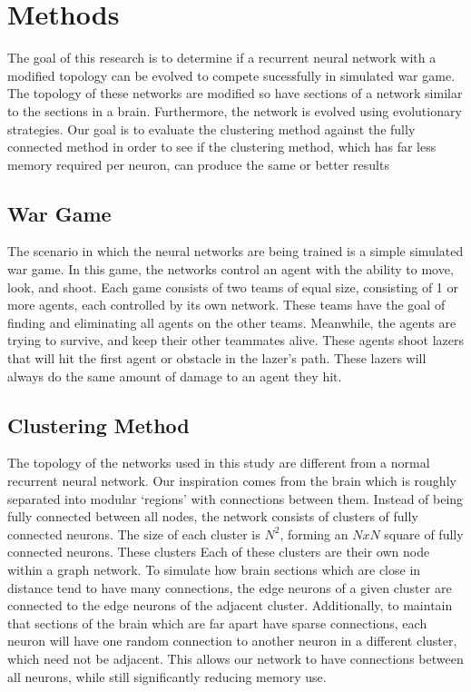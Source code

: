 \documentclass[journal]{IEEEtran}
\begin{document}
\section{Methods}
    The goal of this research is to determine if a recurrent neural network with a modified topology can be evolved to 
    compete sucessfully in simulated war game. The topology of these networks are modified so have sections of a network similar
    to the sections in a brain. Furthermore, the network is evolved using evolutionary strategies. Our goal is to evaluate the 
    clustering method against the fully connected method in order to see if the clustering method, which has far less
    memory required per neuron, can produce the same or better results

    \subsection{War Game}
    The scenario in which the neural networks are being trained is a simple simulated war game. In this game, the networks control an agent
    with the ability to move, look, and shoot. Each game consists of two teams of equal size, consisting of 1 or more agents, each controlled by its own network.
    These teams have the goal of finding and eliminating all agents on the other teams. Meanwhile, the agents are trying to survive, and keep their other teammates alive.
    These agents shoot lazers that will hit the first agent or obstacle in the lazer's path. These lazers will always do the same amount of damage to an agent they hit.

    \subsection{Clustering Method}
    The topology of the networks used in this study are different from a normal recurrent neural network. 
    Our inspiration comes from the brain which is roughly separated into modular ‘regions’ with connections between them.
    Instead of being fully
    connected between all nodes, the network consists of clusters of fully connected neurons. The size of each cluster is $N^2$,
    forming an $NxN$ square of fully connected neurons. These clusters  Each of these clusters are their own node within a graph network. 
    To simulate how brain sections which are close in distance tend to have many connections,
    the edge neurons of a given cluster are connected to the edge neurons of the adjacent cluster. Additionally, to maintain 
    that sections of the brain which are far apart have sparse connections, each neuron will have one random connection to 
    another neuron in a different cluster, which need not be adjacent. This allows our network to have connections between all
    neurons, while still significantly reducing memory use. 
\end{document}
